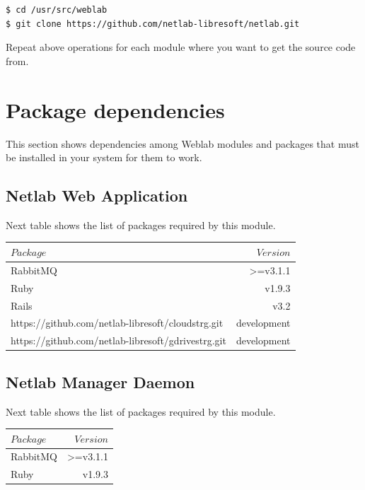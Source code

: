 \documentclass{article}
\begin{document}
\begin{verbatim}
$ cd /usr/src/weblab
$ git clone https://github.com/netlab-libresoft/netlab.git
\end{verbatim}

Repeat above operations for each module where you want to get the source code from.

\section{Package dependencies}
This section shows dependencies among Weblab modules and packages that must be installed in your system for them to work.

\subsection{Netlab Web Application}
\label{sub:Netlab} 
Next table shows the list of packages required by this module.

\begin{center}
\begin{tabular}{|l|r|}
	\hline
$Package$ & $Version$  \\
	\hline
RabbitMQ & \textgreater=v3.1.1 \\
Ruby & v1.9.3 \\
Rails & v3.2 \\
https://github.com/netlab-libresoft/cloudstrg.git & development \\
https://github.com/netlab-libresoft/gdrivestrg.git & development  \\
	\hline
\end{tabular}
\end{center}

\subsection{Netlab Manager Daemon}
\label{sub:NetlabManager}
Next table shows the list of packages required by this module.

\begin{center}
\begin{tabular}{|l|r|}
	\hline
$Package$ & $Version$  \\
	\hline
RabbitMQ & \textgreater=v3.1.1 \\
Ruby & v1.9.3 \\
	\hline
\end{tabular}
\end{center}
\end{document}
